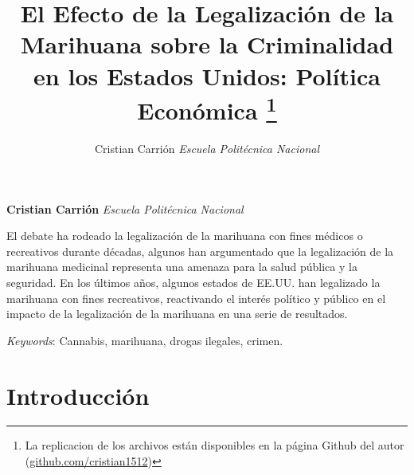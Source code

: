 \documentclass[11pt,]{article}
\title{El Efecto de la Legalización de la Marihuana sobre la Criminalidad en
los Estados Unidos: Política Económica \thanks{La replicacion de los archivos están disponibles en la página Github del
autor (\href{https://github.com/cristian1512}{github.com/cristian1512})}  }
\author{\Large Cristian Carrión\vspace{0.05in} \newline\normalsize\emph{Escuela Politécnica Nacional}  }
\date{}
\newcommand*{\authorfont}{\fontfamily{phv}\selectfont}
\renewenvironment{abstract}
 {{%
    \setlength{\leftmargin}{0mm}
    \setlength{\rightmargin}{\leftmargin}%
  }%
  \relax}
 {\endlist}
\begin{document}
	
%

{%
\setlength{\parindent}{0pt}
\thispagestyle{plain}
{\fontsize{18}{20}\selectfont\raggedright 
\maketitle  %

}

{
   \vskip 13.5pt\relax \normalsize\fontsize{11}{12} 
\textbf{\authorfont Cristian Carrión} \hskip 15pt \emph{\small Escuela Politécnica Nacional}   

}

}








\begin{abstract}

    \hbox{\vrule height .2pt width 39.14pc}

    \vskip 8.5pt %

\noindent El debate ha rodeado la legalización de la marihuana con fines médicos o
recreativos durante décadas, algunos han argumentado que la legalización
de la marihuana medicinal representa una amenaza para la salud pública y
la seguridad. En los últimos años, algunos estados de EE.UU. han
legalizado la marihuana con fines recreativos, reactivando el interés
político y público en el impacto de la legalización de la marihuana en
una serie de resultados.


\vskip 8.5pt \noindent \emph{Keywords}: Cannabis, marihuana, drogas ilegales, crimen. \par

    \hbox{\vrule height .2pt width 39.14pc}



\end{abstract}


\vskip 6.5pt

{
\hypersetup{linkcolor=black}
\setcounter{tocdepth}{2}
\tableofcontents
}

\noindent  \hypertarget{introduccion}{%
\section{Introducción}\label{introduccion}}
\end{document}
